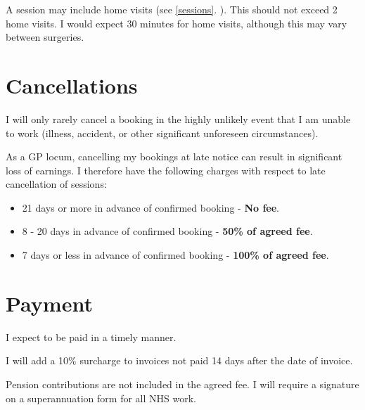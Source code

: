 \documentclass[12pt, a4paper]{article}
\begin{document}
A session may include home visits (see \ref{sessions}. ).
This should not exceed 2 home visits.
I would expect 30 minutes for home visits, although this may vary between surgeries.

\section{Cancellations}

I will only rarely cancel a booking in the highly unlikely event that I am unable to work (illness, accident, or other significant unforeseen circumstances).

As a GP locum, cancelling my bookings at late notice can result in significant loss of earnings.
I therefore have the following charges with respect to late cancellation of sessions:

\begin{itemize}
  \item 21 days or more in advance of confirmed booking - \textbf{No fee}.
  \item 8 - 20 days in advance of confirmed booking - \textbf{50\% of agreed fee}.
  \item 7 days or less in advance of confirmed booking - \textbf{100\% of agreed fee}.
\end{itemize}

\section{Payment}

I expect to be paid in a timely manner.

I will add a 10\% surcharge to invoices not paid 14 days after the date of invoice.

Pension contributions are not included in the agreed fee.
I will require a signature on a superannuation form for all NHS work.
\end{document}
